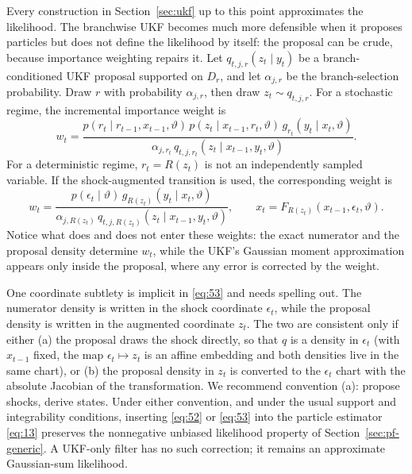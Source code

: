 \documentclass[11pt]{article}
\begin{document}
Every construction in Section~\ref{sec:ukf} up to this point approximates the
likelihood. The branchwise UKF becomes much more defensible when it proposes
particles but does not define the likelihood by itself: the proposal can be
crude, because importance weighting repairs it. Let
$q_{t,j,r}(z_t\mid y_t)$ be a branch-conditioned UKF proposal supported on
$D_r$, and let $\alpha_{j,r}$ be the branch-selection probability. Draw $r$
with probability $\alpha_{j,r}$, then draw $z_t\sim q_{t,j,r}$. For a
stochastic regime, the incremental importance weight is
\begin{equation}\label{eq:52}
 w_t=
 \frac{p(r_t\mid r_{t-1},x_{t-1},\vartheta)\,
       p(z_t\mid x_{t-1},r_t,\vartheta)\,
       g_{r_t}(y_t\mid x_t,\vartheta)}
      {\alpha_{j,r_t}\,
       q_{t,j,r_t}(z_t\mid x_{t-1},y_t,\vartheta)}.
\end{equation}
For a deterministic regime, $r_t=R(z_t)$ is not an independently sampled
variable. If the shock-augmented transition is used, the corresponding weight
is
\begin{equation}\label{eq:53}
 w_t=
 \frac{p(\epsilon_t\mid\vartheta)\,
       g_{R(z_t)}(y_t\mid x_t,\vartheta)}
      {\alpha_{j,R(z_t)}\,
       q_{t,j,R(z_t)}(z_t\mid x_{t-1},y_t,\vartheta)},
 \qquad x_t=F_{R(z_t)}(x_{t-1},\epsilon_t,\vartheta).
\end{equation}
Notice what does and does not enter these weights: the exact numerator and
the proposal density determine $w_t$, while the UKF's Gaussian moment
approximation appears only inside the proposal, where any error is corrected
by the weight.

One coordinate subtlety is implicit in \eqref{eq:53} and needs spelling out.
The numerator density is written in the shock coordinate $\epsilon_t$, while
the proposal density is written in the augmented coordinate $z_t$. The two
are consistent only if either (a) the proposal draws the shock directly, so
that $q$ is a density in $\epsilon_t$ (with $x_{t-1}$ fixed, the map
$\epsilon_t\mapsto z_t$ is an affine embedding and both densities live in the
same chart), or (b) the proposal density in $z_t$ is converted to the
$\epsilon_t$ chart with the absolute Jacobian of the transformation. We
recommend convention (a): propose shocks, derive states. Under either
convention, and under the usual support and integrability conditions,
inserting \eqref{eq:52} or \eqref{eq:53} into the particle estimator
\eqref{eq:13} preserves the nonnegative unbiased likelihood property of
Section~\ref{sec:pf-generic}. A UKF-only filter has no such correction; it
remains an approximate Gaussian-sum likelihood.
\end{document}

